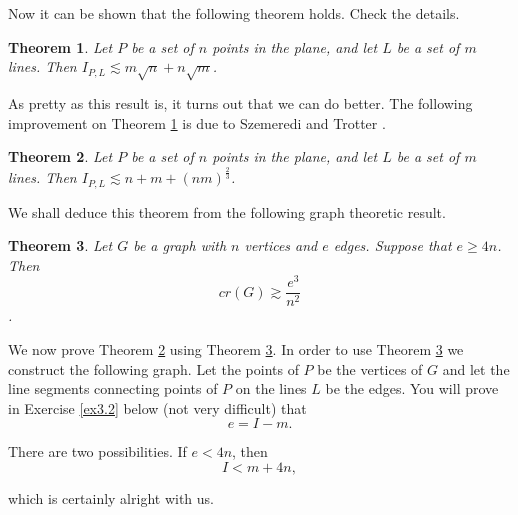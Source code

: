 \documentclass[]{amsart}
\numberwithin{equation}{section}
\theoremstyle{plain}
\newtheorem{theorem}{Theorem}[section]
\theoremstyle{definition}
\theoremstyle{remark}
\begin{document}
Now it can be shown that the following theorem holds.  Check the details.

%

%


\begin{theorem} \label{incidencebound.thm}
Let $P$ be a set of $n$ points in the plane, and let
$L$ be a set of $m$ lines. Then $I_{P,L} \lesssim m \sqrt{n} +  n \sqrt{m}$.

\end{theorem}

As pretty as this result is, it turns out that we can do better.
The following improvement on Theorem \ref{incidencebound.thm} is
due to Szemeredi and Trotter \cite{Sze2}.

\begin{theorem} \label{SzemTrot}
Let $P$ be a set of $n$ points in the plane, and let
$L$ be a set of $m$ lines. Then $I_{P,L} \lesssim n+m+{(nm)}^{\frac{2}{3}}$.
\end{theorem}

We shall deduce this theorem from the following graph theoretic result.

\begin{theorem} \label{crossings}
Let $G$ be a graph with $n$ vertices and $e$
edges. Suppose that $e \ge 4n$. Then \[cr(G) \gtrsim \frac{e^3}{n^2}\].
\end{theorem}

We now prove Theorem \ref{SzemTrot} using Theorem \ref{crossings}.
In order to use Theorem \ref{crossings} we construct the following
graph.  Let the points of $P$ be the vertices of $G$ and let the
line segments connecting points of $P$ on the lines $L$ be the
edges.  You will prove in Exercise \ref{ex3.2} below (not very
difficult) that
\begin{equation} \label{edges.eqn}
 e=I-m.
\end{equation}



There are two possibilities. If $e<4n$, then
\begin{equation} \label{bound1.eqn}
 I<m+4n,
\end{equation}

 which is certainly alright with us.
\end{document}
